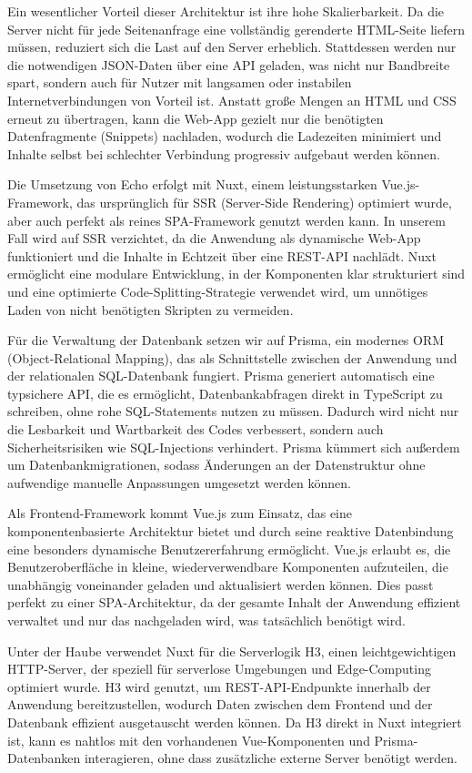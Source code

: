 \documentclass[a4paper,12pt]{article}
\begin{document}
Ein wesentlicher Vorteil dieser Architektur ist ihre hohe Skalierbarkeit. Da
die Server nicht für jede Seitenanfrage eine vollständig gerenderte HTML-Seite
liefern müssen, reduziert sich die Last auf den Server erheblich. Stattdessen
werden nur die notwendigen JSON-Daten über eine API geladen, was nicht nur
Bandbreite spart, sondern auch für Nutzer mit langsamen oder instabilen
Internetverbindungen von Vorteil ist. Anstatt große Mengen an HTML und CSS
erneut zu übertragen, kann die Web-App gezielt nur die benötigten
Datenfragmente (Snippets) nachladen, wodurch die Ladezeiten minimiert und
Inhalte selbst bei schlechter Verbindung progressiv aufgebaut werden können.

Die Umsetzung von Echo erfolgt mit Nuxt, einem leistungsstarken
Vue.js-Framework, das ursprünglich für SSR (Server-Side Rendering) optimiert
wurde, aber auch perfekt als reines SPA-Framework genutzt werden kann. In
unserem Fall wird auf SSR verzichtet, da die Anwendung als dynamische Web-App
funktioniert und die Inhalte in Echtzeit über eine REST-API nachlädt. Nuxt
ermöglicht eine modulare Entwicklung, in der Komponenten klar strukturiert sind
und eine optimierte Code-Splitting-Strategie verwendet wird, um unnötiges Laden
von nicht benötigten Skripten zu vermeiden.

Für die Verwaltung der Datenbank setzen wir auf Prisma, ein modernes ORM
(Object-Relational Mapping), das als Schnittstelle zwischen der Anwendung und
der relationalen SQL-Datenbank fungiert. Prisma generiert automatisch eine
typsichere API, die es ermöglicht, Datenbankabfragen direkt in TypeScript zu
schreiben, ohne rohe SQL-Statements nutzen zu müssen. Dadurch wird nicht nur
die Lesbarkeit und Wartbarkeit des Codes verbessert, sondern auch
Sicherheitsrisiken wie SQL-Injections verhindert. Prisma kümmert sich außerdem
um Datenbankmigrationen, sodass Änderungen an der Datenstruktur ohne aufwendige
manuelle Anpassungen umgesetzt werden können.

Als Frontend-Framework kommt Vue.js zum Einsatz, das eine komponentenbasierte
Architektur bietet und durch seine reaktive Datenbindung eine besonders
dynamische Benutzererfahrung ermöglicht. Vue.js erlaubt es, die
Benutzeroberfläche in kleine, wiederverwendbare Komponenten aufzuteilen, die
unabhängig voneinander geladen und aktualisiert werden können. Dies passt
perfekt zu einer SPA-Architektur, da der gesamte Inhalt der Anwendung effizient
verwaltet und nur das nachgeladen wird, was tatsächlich benötigt wird.

Unter der Haube verwendet Nuxt für die Serverlogik H3, einen leichtgewichtigen
HTTP-Server, der speziell für serverlose Umgebungen und Edge-Computing
optimiert wurde. H3 wird genutzt, um REST-API-Endpunkte innerhalb der Anwendung
bereitzustellen, wodurch Daten zwischen dem Frontend und der Datenbank
effizient ausgetauscht werden können. Da H3 direkt in Nuxt integriert ist, kann
es nahtlos mit den vorhandenen Vue-Komponenten und Prisma-Datenbanken
interagieren, ohne dass zusätzliche externe Server benötigt werden.
\end{document}
